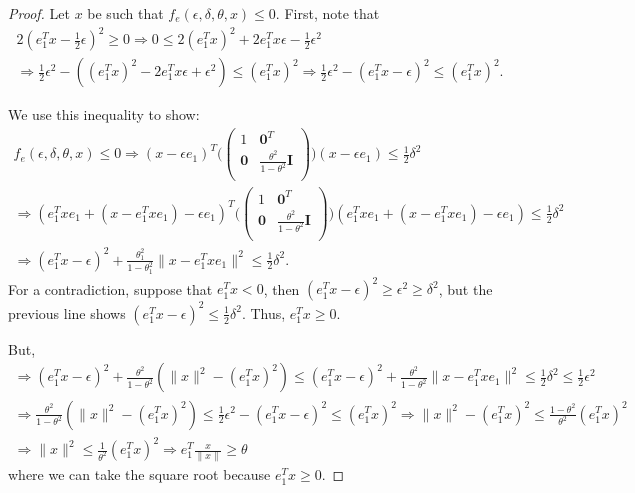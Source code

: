 \documentclass{article}
\theoremstyle{case}
\begin{document}
\begin{proof}
Let $x$ be such that $f_e(\epsilon, \delta, \theta, x) \le 0$.
First, note that
\begin{align*}
2(e_1^Tx - \frac 1 2 \epsilon )^2\ge 0
\Longrightarrow 0 \le 2(e_1^Tx)^2 + 2e_1^Tx\epsilon  - \frac 1 2 \epsilon^2 \\
\Longrightarrow \frac 1 2 \epsilon^2 - \left((e_1^Tx)^2 - 2e_1^Tx\epsilon + \epsilon^2\right) \le (e_1^Tx)^2
\Longrightarrow \frac 1 2 \epsilon^2 - (e_1^Tx - \epsilon)^2 \le (e_1^Tx)^2.
\end{align*}

We use this inequality to show:
\begin{align*}
f_e(\epsilon, \delta, \theta, x) \le 0
\Longrightarrow (x - \epsilon e_1)^T\bigg(\begin{pmatrix}
1 & \boldsymbol0^T \\
\boldsymbol 0 & \frac{\theta^2}{1 - \theta^2} \boldsymbol I \\
\end{pmatrix}\bigg)(x - \epsilon e_1) \le \frac 1 2 \delta^2 \\
\Longrightarrow (e_1^Txe_1 + (x - e_1^Txe_1) - \epsilon e_1)^T\bigg(\begin{pmatrix}
1 & \boldsymbol0^T \\
\boldsymbol 0 & \frac{\theta^2}{1 - \theta^2} \boldsymbol I \\
\end{pmatrix}\bigg)(e_1^Txe_1 + (x - e_1^Txe_1) - \epsilon e_1) \le \frac 1 2 \delta^2 \\
\Longrightarrow 
(e_1^Tx - \epsilon)^2 + \frac{\theta_1^2}{1 - \theta_1^2}\|x - e_1^Tx e_1\|^2 \le \frac 1 2 \delta^2.
\end{align*}
For a contradiction, suppose that $e_1^Tx < 0$, then $(e_1^Tx - \epsilon)^2 \ge \epsilon^2 \ge \delta^2$, but the previous line shows $(e_1^Tx - \epsilon)^2 \le \frac 1 2 \delta^2$.
Thus, $e_1^Tx \ge 0$.

But,
\begin{align*}
\Longrightarrow
(e_1^Tx - \epsilon)^2 + \frac{\theta^2}{1 - \theta^2}\left(\|x\|^2 - (e_1^Tx)^2\right) 
\le (e_1^Tx - \epsilon)^2 + \frac{\theta^2}{1 - \theta^2}\|x - e_1^Tx e_1\|^2 \le \frac 1 2 \delta^2 \le \frac 1 2 \epsilon^2 \\
\Longrightarrow \frac{\theta^2}{1 - \theta^2}(\|x\|^2 - (e_1^Tx)^2) \le \frac 1 2 \epsilon^2 - (e_1^Tx - \epsilon)^2 \le (e_1^Tx)^2
\Longrightarrow \|x\|^2 - (e_1^Tx)^2 \le \frac{1 - \theta^2}{\theta^2}(e_1^Tx)^2 \\
\Longrightarrow \|x\|^2 \le \frac 1 {\theta^2}(e_1^Tx)^2
\Longrightarrow e_1^T\frac{x}{\|x\|} \ge \theta
\end{align*}
where we can take the square root because $e_1^Tx \ge 0$.
\end{proof}
\end{document}
